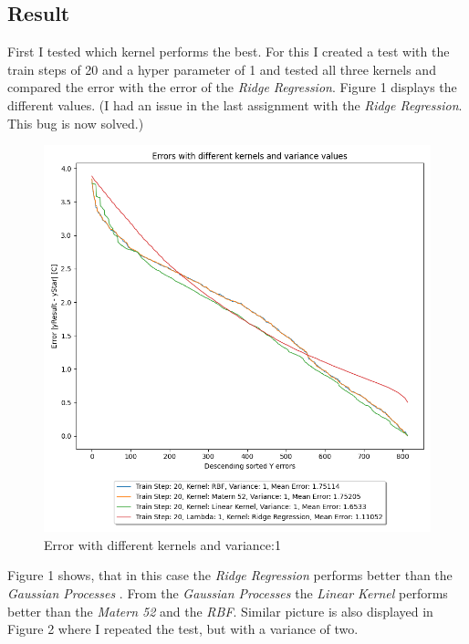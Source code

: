\documentclass[10pt, a4paper, twocolumn]{article} %
\begin{document}
\subsection{Result}
First I tested which kernel performs the best. For this I created a test with the train steps of 20 and a hyper parameter of 1 and tested all three kernels and compared the error with the error of the \textit{Ridge Regression}. Figure 1 displays the different values. (I had an issue in the last assignment with the \textit{Ridge Regression}. This bug is now solved.) 
\begin{figure}[htbp] %
  \centering
  \includegraphics[width=\columnwidth]{pics/TrainStep20_kernel_test.png}
  \caption{Error with different kernels and variance:1}
  \label{fig:fibonacciPlot}
\end{figure}
Figure 1 shows, that in this case the \textit{Ridge Regression} performs better than the \textit{Gaussian Processes }. From the \textit{Gaussian Processes} the \textit{Linear Kernel} performs better than the \textit{Matern 52} and the \textit{RBF}. Similar picture is also displayed in Figure 2 where I repeated the test, but with a variance of two.
\end{document}
